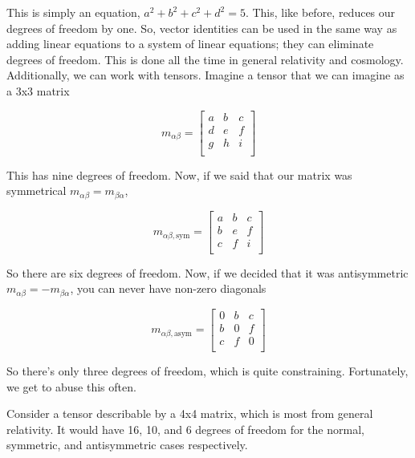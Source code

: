 \documentclass{article}
\begin{document}
This is simply an equation, $a^2 + b^2 + c^2 + d^2 = 5$. This, like before, reduces our degrees of freedom by one. So, vector identities can be used in the same way as adding linear equations to a system of linear equations; they can eliminate degrees of freedom. This is done all the time in general relativity and cosmology. Additionally, we can work with tensors. Imagine a tensor that we can imagine as a 3x3 matrix

\begin{equation}
    m_{\alpha\beta} = \begin{bmatrix}
    a & b & c \\
    d & e & f \\
    g & h & i \\
    \end{bmatrix}
\end{equation}

This has nine degrees of freedom. Now, if we said that our matrix was symmetrical $m_{\alpha\beta} = m_{\beta\alpha}$,

\begin{equation}
    m_{\alpha\beta, \text{sym}} = \begin{bmatrix}
    a & b & c \\
    b & e & f \\
    c & f & i \\
    \end{bmatrix}
\end{equation}

So there are six degrees of freedom. Now, if we decided that it was antisymmetric $m_{\alpha\beta} = - m_{\beta\alpha}$, you can never have non-zero diagonals 

\begin{equation}
    m_{\alpha\beta, \text{asym}} = \begin{bmatrix}
    0 & b & c \\
    b & 0 & f \\
    c & f & 0 \\
    \end{bmatrix}
\end{equation}

So there's only three degrees of freedom, which is quite constraining. Fortunately, we get to abuse this often. 

Consider a tensor describable by a 4x4 matrix, which is most from general relativity. It would have 16, 10, and 6 degrees of freedom for the normal, symmetric, and antisymmetric cases respectively.
\end{document}

